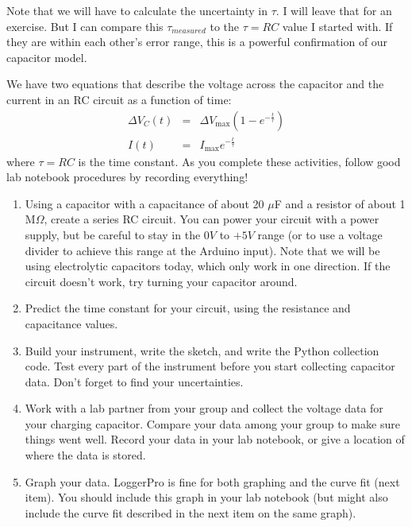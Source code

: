 Note that we will have to calculate the uncertainty in $\tau .$ I will leave
that for an exercise. But I can compare this $\tau _{measured}$ to the $\tau
=RC$ value I started with. If they are within each other's error range, this
is a powerful confirmation of our capacitor model.

\activity
{
We have two equations that describe the voltage across the capacitor and
the current in an RC circuit as a function of time:
\begin{eqnarray*}
	\Delta V_{C}\left( t\right) &=&\Delta V_{\max }\left( 1-e^{-\frac{t}{\tau }%
}\right) \\
	I\left( t\right) &=&I_{\max }e^{-\frac{t}{\tau }}
\end{eqnarray*}%
where $\tau =RC$
is the time constant. As you complete these activities, follow good lab
notebook procedures by recording everything!

\begin{enumerate}
\item Using a capacitor with a capacitance of about 20 $\mu$F
and a resistor of about 1 M$\Omega$,
create a series RC circuit. You can power your circuit with a power supply,
but be careful to stay in the $0\unit{V}$ to $+5\unit{V}$
range (or to use a voltage divider to achieve this range at the Arduino
input). Note that we will be using electrolytic capacitors today, which only
work in one direction. If the circuit doesn't work, try turning your capacitor
around.

\item Predict the time constant for your circuit, using the resistance and
	capacitance values.
\item Build your instrument, write the sketch, and write the Python collection
code. Test every part of the instrument before you start collecting
capacitor data. Don't forget to find your uncertainties. 

\item Work with a lab
partner from your group and collect the voltage data for your charging
capacitor. Compare your data
among your group to make sure things went well. Record your data in your
lab notebook, or give a location of where the data is stored.

\item Graph your data. LoggerPro is fine for both
graphing and the curve fit (next item). You should include this graph in
your lab notebook (but might also include the curve fit described in the
next item on the same graph).


\end{enumerate}}

